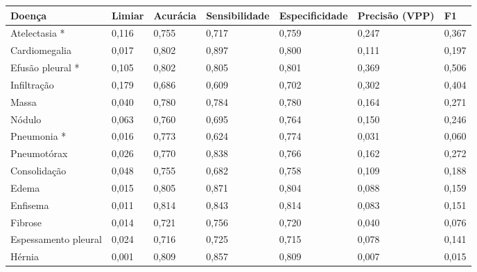 \begin{tabular}{lllllll}
\toprule
Doença & Limiar & Acurácia & Sensibilidade & Especificidade & Precisão (VPP) & F1 \\
\midrule
Atelectasia * & 0,116 & 0,755 & 0,717 & 0,759 & 0,247 & 0,367 \\
Cardiomegalia & 0,017 & 0,802 & 0,897 & 0,800 & 0,111 & 0,197 \\
Efusão pleural * & 0,105 & 0,802 & 0,805 & 0,801 & 0,369 & 0,506 \\
Infiltração & 0,179 & 0,686 & 0,609 & 0,702 & 0,302 & 0,404 \\
Massa & 0,040 & 0,780 & 0,784 & 0,780 & 0,164 & 0,271 \\
Nódulo & 0,063 & 0,760 & 0,695 & 0,764 & 0,150 & 0,246 \\
Pneumonia * & 0,016 & 0,773 & 0,624 & 0,774 & 0,031 & 0,060 \\
Pneumotórax & 0,026 & 0,770 & 0,838 & 0,766 & 0,162 & 0,272 \\
Consolidação & 0,048 & 0,755 & 0,682 & 0,758 & 0,109 & 0,188 \\
Edema & 0,015 & 0,805 & 0,871 & 0,804 & 0,088 & 0,159 \\
Enfisema & 0,011 & 0,814 & 0,843 & 0,814 & 0,083 & 0,151 \\
Fibrose & 0,014 & 0,721 & 0,756 & 0,720 & 0,040 & 0,076 \\
Espessamento pleural & 0,024 & 0,716 & 0,725 & 0,715 & 0,078 & 0,141 \\
Hérnia & 0,001 & 0,809 & 0,857 & 0,809 & 0,007 & 0,015 \\
\bottomrule
\end{tabular}
